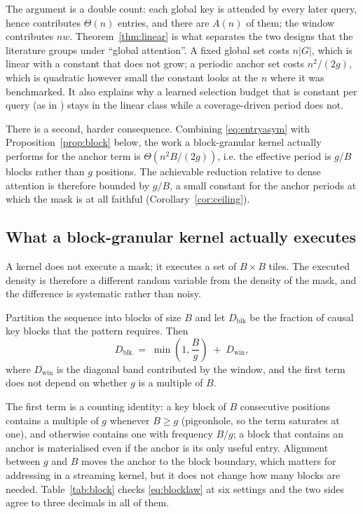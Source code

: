 The argument is a double count: each global key is attended by every later query,
hence contributes $\Theta(n)$ entries, and there are $A(n)$ of them; the window
contributes $nw$. Theorem~\ref{thm:linear} is what separates the two designs that
the literature groups under ``global attention''. A fixed global set costs
$n\lvert G\rvert$, which is linear with a constant that does not grow; a periodic
anchor set costs $n^2/(2g)$, which is quadratic however small the constant looks
at the $n$ where it was benchmarked. It also explains why a learned selection
budget that is constant per query (as in \cite{zhou2021informer}) stays in the
linear class while a coverage-driven period does not.

There is a second, harder consequence. Combining \eqref{eq:entryasym} with
Proposition~\ref{prop:block} below, the work a block-granular kernel actually
performs for the anchor term is $\Theta(n^2 B/(2g))$, i.e. the effective period is
$g/B$ blocks rather than $g$ positions. The achievable reduction relative to
dense attention is therefore bounded by $g/B$, a small constant for the anchor
periods at which the mask is at all faithful
(Corollary~\ref{cor:ceiling}).

\subsection{What a block-granular kernel actually executes}\label{sec:blocklaw}

A kernel does not execute a mask; it executes a set of $B\times B$ tiles. The
executed density is therefore a different random variable from the density of the
mask, and the difference is systematic rather than noisy.

\begin{proposition}\label{prop:block}
Partition the sequence into blocks of size $B$ and let $D_{\mathrm{blk}}$ be the
fraction of causal key blocks that the pattern requires. Then
\begin{equation}
D_{\mathrm{blk}} \;=\; \min\!\left(1,\frac{B}{g}\right) \;+\; D_{\mathrm{win}},
\label{eq:blocklaw}
\end{equation}
where $D_{\mathrm{win}}$ is the diagonal band contributed by the window, and the
first term does not depend on whether $g$ is a multiple of $B$.
\end{proposition}

The first term is a counting identity: a key block of $B$ consecutive positions
contains a multiple of $g$ whenever $B\ge g$ (pigeonhole, so the term saturates at
one), and otherwise contains one with frequency $B/g$; a block that contains an
anchor is materialised even if the anchor is its only useful entry. Alignment
between $g$ and $B$ moves the anchor to the block boundary, which matters for
addressing in a streaming kernel, but it does not change how many blocks are
needed. Table~\ref{tab:block} checks \eqref{eq:blocklaw} at six settings and the
two sides agree to three decimals in all of them.

